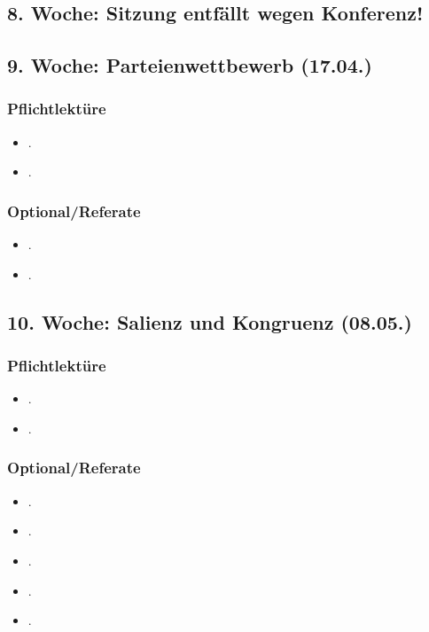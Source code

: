 \documentclass[abstract=on,parskip=full,headings=standardclasses,fontsize=11pt,paper=a4]{scrartcl}
\begin{document}
\subsection{8. Woche: Sitzung entfällt wegen Konferenz!}


\subsection{9. Woche: Parteienwettbewerb (17.04.)}

\subsubsection*{Pflichtlektüre}
\begin{itemize}
\item {}.
\item {}.
\end{itemize}

\subsubsection*{Optional/Referate}
\begin{itemize}
\item {}.
\item {}.
\end{itemize}


\subsection{10. Woche: Salienz und Kongruenz (08.05.)}

\subsubsection*{Pflichtlektüre}
\begin{itemize}
\item {}.
\item {}.
\end{itemize}

\subsubsection*{Optional/Referate}
\begin{itemize}
\item {}.
\item {}.
\item {}.
\item {}.
\item {}.
\end{itemize}
\end{document}
